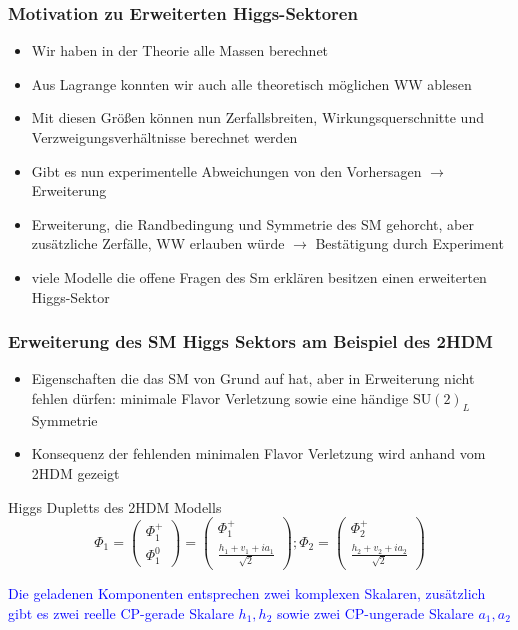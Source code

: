 \documentclass[xcolor=dvipsnames]{beamer}
\begin{document}
\begin{frame}
\frametitle{Motivation zu Erweiterten Higgs-Sektoren}
\begin{itemize}
\item Wir haben in der Theorie alle Massen berechnet 
\item Aus Lagrange konnten wir auch alle theoretisch möglichen WW ablesen 
\item Mit diesen Größen können nun Zerfallsbreiten, Wirkungsquerschnitte und Verzweigungsverhältnisse berechnet werden
\item Gibt es nun experimentelle Abweichungen von den Vorhersagen $\rightarrow$ Erweiterung
\item Erweiterung, die Randbedingung und Symmetrie des SM gehorcht, aber zusätzliche Zerfälle, WW erlauben würde $\rightarrow$ Bestätigung durch Experiment 
\item viele Modelle die offene Fragen des Sm erklären besitzen einen erweiterten Higgs-Sektor 
\end{itemize}
\end{frame}


\begin{frame}
\frametitle{Erweiterung des SM Higgs Sektors am Beispiel des 2HDM}
\begin{itemize}
\item Eigenschaften die das SM von Grund auf hat, aber in Erweiterung nicht fehlen dürfen: minimale Flavor Verletzung sowie eine händige $\text{SU}(2)_L$ Symmetrie
\item  Konsequenz der fehlenden minimalen Flavor Verletzung wird anhand vom 2HDM gezeigt
\end{itemize}
\begin{block}{Higgs Dupletts des 2HDM Modells }
\begin{equation*}
\Phi_{1}=\left( \begin{array}{c} \Phi^{+}_{1}\\ \Phi^{0}_{1} \end{array}\right)=\left( \begin{array}{c}\Phi^{+}_{1} \\  \frac{h_{1}+v_{1}+ia_{1}}{\sqrt{2}}\end{array}\right) ; \Phi_{2}=\left( \begin{array}{c}\Phi^{+}_{2} \\  \frac{h_{2}+v_{2}+ia_{2}}{\sqrt{2}} \end{array}\right) 
\end{equation*}
\end{block}
\textcolor{Blue}{Die geladenen Komponenten entsprechen zwei komplexen Skalaren, zusätzlich gibt es zwei reelle CP-gerade Skalare $h_{1},h_{2}$ sowie zwei CP-ungerade Skalare $a_{1},a_{2}$ \autocite{5}}
\end{frame}
\end{document}
